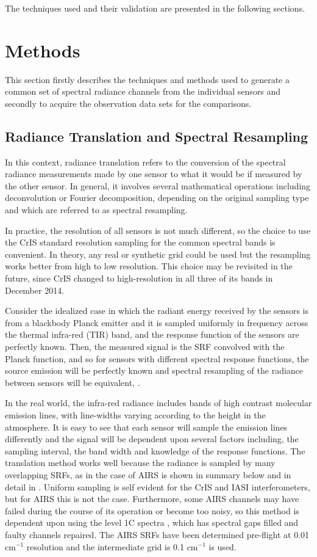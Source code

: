 \documentclass[twocolumn,10pt]{article}
\begin{document}
The techniques used and their validation are presented in the following sections.  

\section{Methods}

This section firstly describes the techniques and methods used to generate a common set of spectral radiance channels from the individual sensors and secondly to acquire the observation data sets for the comparisons. 

\subsection{Radiance Translation and Spectral Resampling}

In this context, radiance translation refers to the conversion of the spectral radiance measurements made by one sensor to what it would be if measured by the other sensor. In general, it involves several mathematical operations including deconvolution or Fourier decomposition, depending on the original sampling type and which are referred to as spectral resampling.

In practice, the resolution of all sensors is not much different, so the choice to use the CrIS standard resolution sampling for the common spectral bands is convenient. In theory, any real or synthetic grid could be used but the resampling works better from high to low resolution. This choice may be revisited in the future, since CrIS changed to high-resolution in all three of its bands in December 2014.

Consider the idealized case in which the radiant energy received by the sensors is from a blackbody Planck emitter and it is sampled uniformly in frequency across the thermal infra-red (TIR) band, and the response function of the sensors are perfectly known. Then, the measured signal is the SRF convolved with the Planck function, and so for sensors with different spectral response functions, the source emission will be perfectly known and spectral resampling of the radiance between sensors will be equivalent, \cite{Motteler2017b}. 

In the real world, the infra-red radiance includes bands of high contrast molecular emission lines, with line-widths varying according to the height in the atmosphere. It is easy to see that each sensor will sample the emission lines differently and the signal will be dependent upon several factors including, the sampling interval, the band width and knowledge of the response functions. The translation method works well because the radiance is sampled by many overlapping SRFs, as in the case of AIRS is shown in summary below and in detail in \cite{Motteler2017a}. Uniform sampling is self evident for the CrIS and IASI interferometers, but for AIRS this is not the case. Furthermore, some AIRS channels may have failed during the course of its operation or become too noisy, so this method is dependent upon using the level 1C spectra \cite{Manning2015}, which has spectral gaps filled and faulty channels repaired. The AIRS SRFs have been determined pre-flight at 0.01 cm$^{-1}$ resolution and the intermediate grid is 0.1 cm$^{-1}$ is used.
\end{document}
